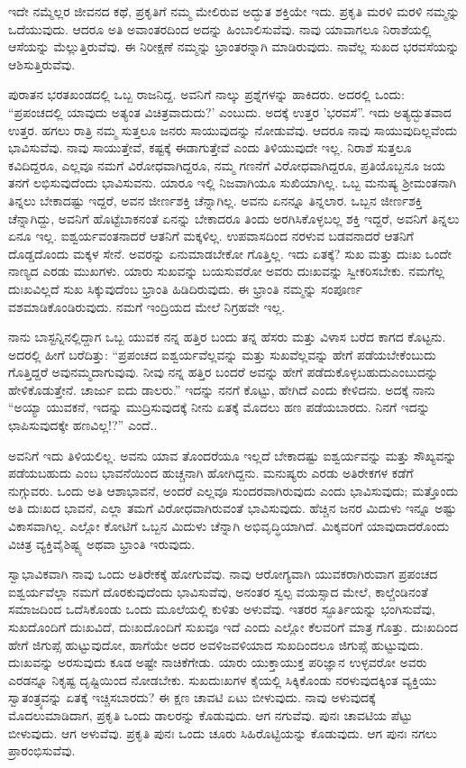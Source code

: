 ಇದೇ ನಮ್ಮೆಲ್ಲರ ಜೀವನದ ಕಥೆ, ಪ್ರಕೃತಿಗೆ ನಮ್ಮ ಮೇಲಿರುವ ಅದ್ಭುತ ಶಕ್ತಿಯೇ ಇದು. ಪ್ರಕೃತಿ ಮರಳಿ ಮರಳಿ ನಮ್ಮನ್ನು ಒದೆಯುವುದು. ಆದರೂ ಅತಿ ಅವಾಂತರದಿಂದ ಅದನ್ನು ಹಿಂಬಾಲಿಸುವೆವು. ನಾವು ಯಾವಾಗಲೂ ನಿರಾಶೆಯಲ್ಲಿ ಆಸೆಯನ್ನು ಮೆಲ್ಲುತ್ತಿರುವೆವು. ಈ ನಿರೀಕ್ಷಣೆ ನಮ್ಮನ್ನು ಭ್ರಾಂತರನ್ನಾಗಿ ಮಾಡಿರುವುದು. ನಾವೆಲ್ಲ ಸುಖದ ಭರವಸೆಯನ್ನು ಆಶಿಸುತ್ತಿರುವೆವು.

ಪುರಾತನ ಭರತಖಂಡದಲ್ಲಿ ಒಬ್ಬ ರಾಜನಿದ್ದ. ಅವನಿಗೆ ನಾಲ್ಕು ಪ್ರಶ್ನೆಗಳನ್ನು ಹಾಕಿದರು. ಅದರಲ್ಲಿ ಒಂದು: “ಪ್ರಪಂಚದಲ್ಲಿ ಯಾವುದು ಅತ್ಯಂತ ವಿಚಿತ್ರವಾದುದು?' ಎಂಬುದು. ಅದಕ್ಕೆ ಉತ್ತರ 'ಭರವಸೆ”. ಇದು ಅತ್ಯದ್ಭುತವಾದ ಉತ್ತರ. ಹಗಲು ರಾತ್ರಿ ನಮ್ಮ ಸುತ್ತಲೂ ಜನರು ಸಾಯುವುದನ್ನು ನೋಡುವೆವು. ಆದರೂ ನಾವು ಸಾಯುವುದಿಲ್ಲವೆಂದು ಭಾವಿಸುವೆವು. ನಾವು ಸಾಯುತ್ತೇವೆ, ಕಷ್ಟಕ್ಕೆ ಈಡಾಗುತ್ತೇವೆ ಎಂದು ತಿಳಿಯುವುದೇ ಇಲ್ಲ. ನಿರಾಶೆ ಸುತ್ತಲೂ ಕವಿದಿದ್ದರೂ, ಎಲ್ಲವೂ ನಮಗೆ ವಿರೋಧವಾಗಿದ್ದರೂ, ನಮ್ಮ ಗಣನೆಗೆ ವಿರೋಧವಾಗಿದ್ದರೂ, ಪ್ರತಿಯೊಬ್ಬನೂ ಜಯ ತನಗೆ ಲಭಿಸುವುದೆಂದು ಭಾವಿಸುವನು. ಯಾರೂ ಇಲ್ಲಿ ನಿಜವಾಗಿಯೂ ಸುಖಿಯಾಗಿಲ್ಲ. ಒಬ್ಬ ಮನುಷ್ಯ ಶ‍್ರೀಮಂತನಾಗಿ ತಿನ್ನಲು ಬೇಕಾದಷ್ಟು ಇದ್ದರೆ, ಅವನ ಜೀರ್ಣಶಕ್ತಿ ಚೆನ್ನಾಗಿಲ್ಲ. ಅವನು ಏನನ್ನೂ ತಿನ್ನಲಾರ. ಒಬ್ಬನ ಜೀರ್ಣಶಕ್ತಿ ಚೆನ್ನಾಗಿದ್ದು, ಅವನಿಗೆ ಹೊಟ್ಟೆಬಾಕನಂತೆ ಏನನ್ನು ಬೇಕಾದರೂ ತಿಂದು ಅರಗಿಸಿಕೊಳ್ಳಬಲ್ಲ ಶಕ್ತಿ ಇದ್ದರೆ, ಅವನಿಗೆ ತಿನ್ನಲು ಏನೂ ಇಲ್ಲ. ಐಶ್ವರ್ಯವಂತನಾದರೆ ಆತನಿಗೆ ಮಕ್ಕಳಿಲ್ಲ. ಉಪವಾಸದಿಂದ ನರಳುವ ಬಡವನಾದರೆ ಆತನಿಗೆ ದೊಡ್ಡದೊಂದು ಮಕ್ಕಳ ಸೇನೆ. ಅವರನ್ನು ಏನುಮಾಡಬೇಕೋ ಗೊತ್ತಿಲ್ಲ. ಇದು ಏತಕ್ಕೆ? ಸುಖ ಮತ್ತು ದುಃಖ ಒಂದೇ ನಾಣ್ಯದ ಎರಡು ಮುಖಗಳು. ಯಾರು ಸುಖವನ್ನು ಬಯಸುವರೋ ಅವರು ದುಃಖವನ್ನು ಸ್ವೀಕರಿಸಬೇಕು. ನಮಗೆಲ್ಲ ದುಃಖವಿಲ್ಲದೆ ಸುಖ ಸಿಕ್ಕುವುದೆಂಬ ಭ್ರಾಂತಿ ಹಿಡಿದಿರುವುದು. ಈ ಭ್ರಾಂತಿ ನಮ್ಮನ್ನು ಸಂಪೂರ್ಣ ವಶಮಾಡಿಕೊಂಡಿರುವುದು. ನಮಗೆ ಇಂದ್ರಿಯದ ಮೇಲೆ ನಿಗ್ರಹವೇ ಇಲ್ಲ.

ನಾನು ಬಾಸ್ಟನ್ನಿನಲ್ಲಿದ್ದಾಗ ಒಬ್ಬ ಯುವಕ ನನ್ನ ಹತ್ತಿರ ಬಂದು ತನ್ನ ಹೆಸರು ಮತ್ತು ವಿಳಾಸ ಬರೆದ ಕಾಗದ ಕೊಟ್ಟನು. ಅದರಲ್ಲಿ ಹೀಗೆ ಬರೆದಿತ್ತು: “ಪ್ರಪಂಚದ ಐಶ್ವರ್ಯವೆಲ್ಲವನ್ನು ಮತ್ತು ಸುಖವೆಲ್ಲವನ್ನು ಹೇಗೆ ಪಡೆಯಬೇಕೆಂಬುದು ಗೊತ್ತಿದ್ದರೆ ಅವು\break ನಮ್ಮದಾಗುವುವು. ನೀವು ನನ್ನ ಹತ್ತಿರ ಬಂದರೆ ಅವನ್ನು ಹೇಗೆ ಪಡೆದುಕೊಳ್ಳಬಹುದು\break ಎಂಬುದನ್ನು ಹೇಳಿಕೊಡುತ್ತೇನೆ. ಚಾರ್ಜು ಐದು ಡಾಲರು.” ಇದನ್ನು ನನಗೆ ಕೊಟ್ಟು, ಹೇಗಿದೆ ಎಂದು ಕೇಳಿದನು. ಅದಕ್ಕೆ ನಾನು “ಅಯ್ಯಾ ಯುವಕನೆ, ಇದನ್ನು ಮುದ್ರಿಸುವುದಕ್ಕೆ ನೀನು ಏತಕ್ಕೆ ಮೊದಲು ಹಣ ಪಡೆಯಬಾರದು. ನಿನಗೆ ಇದನ್ನು ಛಾಪಿಸುವುದಕ್ಕೇ ಹಣವಿಲ್ಲ!?” ಎಂದೆ..

ಅವನಿಗೆ ಇದು ತಿಳಿಯಲಿಲ್ಲ. ಅವನು ಯಾವ ತೊಂದರೆಯೂ ಇಲ್ಲದೆ ಬೇಕಾದಷ್ಟು ಐಶ್ವರ್ಯವನ್ನು ಮತ್ತು ಸೌಖ್ಯವನ್ನು ಪಡೆಯಬಹುದು ಎಂಬ ಭಾವನೆಯಿಂದ ಹುಚ್ಚನಾಗಿ ಹೋಗಿದ್ದನು. ಮನುಷ್ಯರು ಎರಡು ಅತಿರೇಕಗಳ ಕಡೆಗೆ ನುಗ್ಗುವರು. ಒಂದು ಅತಿ ಆಶಾಭಾವನೆ, ಅಂದರೆ ಎಲ್ಲವೂ ಸುಂದರವಾಗಿರುವುದು ಎಂದು ಭಾವಿಸುವುದು; ಮತ್ತೊಂದು ಅತಿ ದುಃಖದ ಭಾವನೆ, ಎಲ್ಲಾ ತಮಗೆ ವಿರೋಧವಾಗಿರುವಂತೆ ಭಾವಿಸುವುದು. ಹೆಚ್ಚಿನ ಜನರ ಮಿದುಳು ಇನ್ನೂ ಅಷ್ಟು ವಿಕಾಸವಾಗಿಲ್ಲ. ಎಲ್ಲೋ ಕೋಟಿಗೆ ಒಬ್ಬನ ಮಿದುಳು ಚೆನ್ನಾಗಿ ಅಭಿವೃದ್ಧಿಯಾಗಿದೆ. ಮಿಕ್ಕವರಿಗೆ ಯಾವುದಾದರೊಂದು ವಿಚಿತ್ರ ವ್ಯಕ್ತಿವೈಶಿಷ್ಟ್ಯ ಅಥವಾ ಭ್ರಾಂತಿ ಇರುವುದು.

ಸ್ವಾಭಾವಿಕವಾಗಿ ನಾವು ಒಂದು ಅತಿರೇಕಕ್ಕೆ ಹೋಗುವೆವು. ನಾವು ಆರೋಗ್ಯವಾಗಿ ಯುವಕರಾಗಿರುವಾಗ ಪ್ರಪಂಚದ ಐಶ್ವರ್ಯವೆಲ್ಲಾ ನಮಗೆ ದೊರಕುವುದೆಂದು ಭಾವಿಸುವೆವು, ಅನಂತರ ಸ್ವಲ್ಪ ವಯಸ್ಸಾದ ಮೇಲೆ, ಕಾಲ್ಚೆಂಡಿನಂತೆ ಸಮಾಜದಿಂದ ಒದೆಸಿಕೊಂಡು ಒಂದು ಮೂಲೆಯಲ್ಲಿ ಕುಳಿತು ಅಳುವೆವು. ಇತರರ ಸ್ಫೂರ್ತಿಯನ್ನು ಭಂಗಿಸುವೆವು, ಸುಖದೊಂದಿಗೆ ದುಃಖವಿದೆ, ದುಃಖದೊಂದಿಗೆ ಸುಖವೂ ಇದೆ ಎಂದು ಎಲ್ಲೋ ಕೆಲವರಿಗೆ ಮಾತ್ರ ಗೊತ್ತು. ದುಃಖದಿಂದ ಹೇಗೆ ಜಿಗುಪ್ಸೆ ಹುಟ್ಟುವುದೋ, ಹಾಗೆಯೇ ಅದರ ಅವಳಿಜವಳಿಯಾದ ಸುಖದಿಂದಲೂ ಜಿಗುಪ್ಸೆ ಹುಟ್ಟುವುದು. ದುಃಖವನ್ನು ಅರಸುವುದು ಕೂಡ ಅಷ್ಟೇ ನಾಚಿಕೆಗೇಡು. ಯಾರು ಯುಕ್ತಾಯುಕ್ತ ಪರಿಜ್ಞಾನ ಉಳ್ಳವರೋ ಅವರು ಎರಡನ್ನೂ ನಿಕೃಷ್ಟ ದೃಷ್ಟಿಯಿಂದ ನೋಡಬೇಕು. ಸುಖದುಃಖಗಳ ಕೈಯಲ್ಲಿ ಸಿಕ್ಕಿಕೊಂಡು ನರಳುವುದಕ್ಕಿಂತ ವ್ಯಕ್ತಿಯು ಸ್ವಾತಂತ್ರ್ಯವನ್ನು ಏತಕ್ಕೆ ಇಚ್ಚಿಸಬಾರದು? ಈ ಕ್ಷಣ ಚಾವಟಿ ಏಟು ಬೀಳುವುದು. ನಾವು ಅಳುವುದಕ್ಕೆ ಮೊದಲುಮಾಡಿದಾಗ, ಪ್ರಕೃತಿ ಒಂದು ಡಾಲರನ್ನು ಕೊಡುವುದು. ಆಗ ನಗುವೆವು. ಪುನಃ ಚಾವಟಿಯ ಪೆಟ್ಟು ಬೀಳುವುದು. ಆಗ ಅಳುವೆವು. ಪ್ರಕೃತಿ ಪುನಃ ಒಂದು ಚೂರು ಸಿಹಿರೊಟ್ಟಿಯನ್ನು ಕೊಡುವುದು. ಆಗ ಪುನಃ ನಗಲು ಪ್ರಾರಂಭಿಸುವೆವು.

